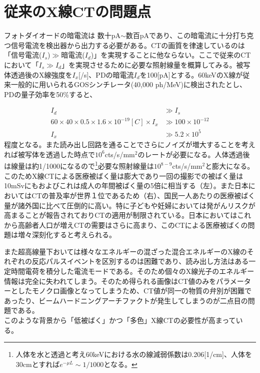 \section{従来のX線CTの問題点}
フォトダイオードの暗電流は 数十pA$\sim$数百pAであり、この暗電流に十分打ち克つ信号電流を検出器から出力する必要がある。CTの画質を律速しているのは「信号電流($I_s$)$\gg$暗電流($I_d$)」を実現することに他ならない。ここで従来のCTにおいて「$I_s\gg I_d$」を実現させるために必要な照射線量を概算してみる。被写体透過後のX線強度を$I_x$[/s]、PDの暗電流$I_d$を100[pA]とする。60keVのX線が従来一般的に用いられるGOSシンチレータ(40,000 ph/MeV)に検出されたとし、PDの量子効率を50\%すると、

\begin{align}
I_d&\gg I_s\\
60\times40\times0.5\times1.6\times10^{-19} [C] \times I_x&\gg100\times10^{-12}\\
I_x&\gg 5.2\times10^5
\end{align}
程度となる。また読み出し回路を通ることでさらにノイズが増大することを考えれば被写体を透過した時点で$10^{6}$cts/s/mm$^2$のレートが必要になる。人体透過後は線量は約1/1000になるので\footnote{人体を水と透過と考え60keVにおける水の線減弱係数は0.206[1/cm]、人体を30cmとすれば$e^{-\mu L}\sim1/1000$となる。}必要な照射線量は$10^{8-9}$cts/s/mm$^2$と膨大になる。このためX線CTによる医療被ばく量は膨大であり一回の撮影での被ばく量は10mSvにもおよびこれは成人の年間被ばく量の5倍に相当する（左）。また日本においてはCTの普及率が世界１位であるため（右）、国民一人あたりの医療被ばく量が諸外国に比べて圧倒的に高い。特に子どもや妊婦においては発がんリスクが高まることが報告されておりCTの適用が制限されている。日本においてはこれから高齢者人口が増えCTの需要はさらに高まり、このCTによる医療被ばくの問題は増々深刻化すると考えられる。

また超高線量下おいては様々なエネルギーの混ざった混合エネルギーのX線のそれぞれの反応パルスイベントを区別するのは困難であり、読み出し方法はある一定時間電荷を積分した電流モードである。そのため個々のX線光子のエネルギー情報は完全に失われてしまう。そのため得られる画像はCT値のみをパラメーターとしたモノクロ画像となってしまうため、CT値が同一の物質の弁別が困難であったり、ビームハードニングアーチファクトが発生してしまうのが二点目の問題である。\\
このような背景から「低被ばく」かつ「多色」X線CTの必要性が高まっている。


